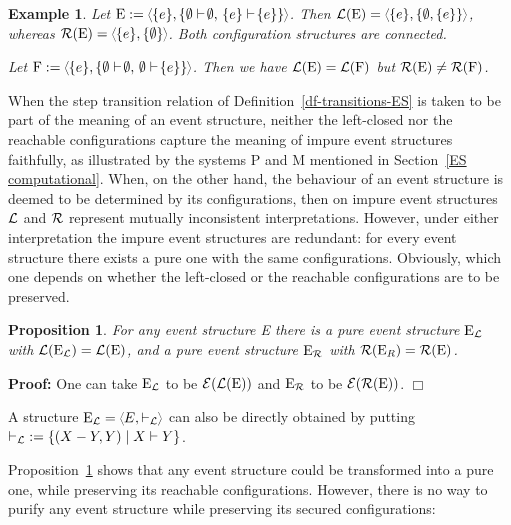 \documentclass[twocolumn]{article}
\newtheorem{prop}{Proposition}[section]
\newtheorem{exam}{Example}
\newenvironment{proposition}[1]{\begin{prop} \rm \label{pr-#1} }{\end{prop}}
\newenvironment{example}[1]{\begin{exam} \rm \label{ex-#1} }{\end{exam}}
\newenvironment{proof}{\begin{trivlist} \item[\hspace{\labelsep}\bf
Proof:]}{\hfill $\Box$\end{trivlist}}
\newcommand{\df}[1]{Definition~\ref{df-#1}}
\newcommand{\pr}[1]{Proposition~\ref{pr-#1}}
\newcommand{\turn}{\vdash}                              \newcommand{\dbigcup}{\bigcup_{\uparrow}}		\newcommand{\nbigcup}{\bigcup_{\bullet}}		\newcommand{\nbigcap}{\bigcap_{\bullet}}		\newcommand{\bbigcup}{\overline{\bigcup}}		\newcommand{\bbigcap}{\overline{\bigcap}}		\newcommand{\nbbigcap}{\bbigcap_{\bullet}}		\newcommand{\fbbigcup}{\overline{\bigcup}^f}		\newcommand{\bbbigcup}{\overline{\bigcup}^2}		\newcommand{\dcup}{~~\makebox[0pt]{\LARGE$\cdot$}\makebox[0pt]{$\cup$}~~}
\begin{document}
\begin{example}{impure}
Let $\eE:=\tuple{\{e\},\{\emptyset\turn\!\emptyset,\,\{e\}\turn\!\{e\}\}}$.
Then $\fL(\eE)=\tuple{\{e\},\{\emptyset,\{e\}\}}$,
whereas $\fR(\eE)=\tuple{\{e\},\{\emptyset\}}$.
Both configuration structures are connected.

Let $\eF:=\tuple{\{e\},\{\emptyset\turn\!\emptyset,\,\emptyset\turn\!\{e\}\}}$.
Then we have ${\cal L}({\rm E})={\cal L}({\rm F})$ but ${\cal R}({\rm E}) \neq {\cal R}({\rm F})$.
\end{example}
When the step transition relation of \df{transitions-ES} is taken to
be part of the meaning of an event structure, neither the left-closed
nor the reachable configurations capture the meaning of impure event
structures faithfully, as illustrated by the systems P and M mentioned
in Section~\ref{ES computational}. When, on the other hand, the
behaviour of an event structure is deemed to be determined by its
configurations, then on impure event structures ${\cal L}$ and ${\cal R}$
represent mutually inconsistent interpretations.
However, under either interpretation the impure event structures are
redundant: for every event structure there exists a pure one with the
same configurations.  Obviously, which one depends on whether the
left-closed or the reachable configurations are to be preserved.

\begin{proposition}{purification}
For any event structure E there is
a pure event structure ${\rm E}_{\cal L}$ with ${\cal L}({\rm E}_{\cal L})={\cal L}({\rm E})$,
and a pure event structure ${\rm E}_{\cal R}$ with ${\cal R}({\rm E}_R)={\cal R}({\rm E})$.
\end{proposition}

\begin{proof}
One can take ${\rm E}_{\cal L}$ to be ${\cal E}({\cal L}({\rm E}))$
and  ${\rm E}_{\cal R}$ to be ${\cal E}({\cal R}({\rm E}))$.
\end{proof}
A structure $\eE_\fL = \tuple{E,\turn_\fL\;}$ can also be directly
obtained by putting $\mathord{\turn_\fL} := \{(X-Y,Y) \mid X \turn Y \}$.

\pr{purification} shows that any event structure could be
transformed into a pure one, while preserving its reachable
configurations.  However, there is no way to purify any event
structure while preserving its secured configurations:
\end{document}
